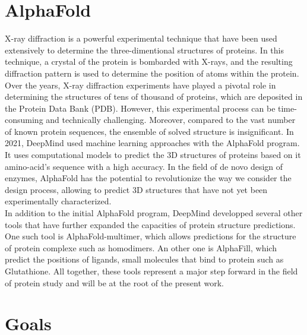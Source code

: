 \section{AlphaFold}
X-ray diffraction is a powerful experimental technique that have been used extensively to determine the three-dimentional structures of proteins. 
In this technique, a crystal of the protein is bombarded with X-rays, and the resulting diffraction pattern is used to determine the position of atoms within the protein. Over the years, X-ray diffraction experiments have played a pivotal role in determining the structures of tens of thousand of proteins, which are deposited in the Protein Data Bank (PDB). 
However, this experimental process can be time-consuming and technically challenging. Moreover, compared to the vast number of known protein sequences, the ensemble of solved structure is insignificant. In 2021, DeepMind \cite{AlphaFold} used machine learning approaches with the AlphaFold program. It uses computational models to predict the 3D structures of proteins based on it amino-acid's sequence with a high accuracy. In the field of de novo design of enzymes, AlphaFold has the potential to revolutionize the way we consider the design process, allowing to predict 3D structures that have not yet been experimentally characterized.\\
\noindent In addition to the initial AlphaFold program, DeepMind developped several other tools that have further expanded the capacities of protein structure predictions. One such tool is AlphaFold-multimer\cite{Multimer}, which allows predictions for the structure of protein complexe such as homodimers. An other one is AlphaFill\cite{AlphaFill}, which predict the positions of ligands, small molecules that bind to protein such as Glutathione. All together, these tools represent a major step forward in the field of protein study and will be at the root of the present work.
\section{Goals}
